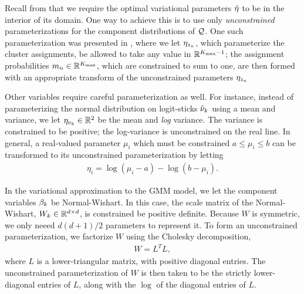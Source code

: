 Recall from  that we require the optimal variational parameters
$\hat\eta$ to be in the interior of its domain. One way to achieve this
is to use only \textit{unconstrained} parameterizations for the
component distributions of $\mathcal{Q}$. One such parameterization was
presented in , where we let
$\eta_{z_n}$, which parameterize the cluster assignments, be allowed to
take any value in $\mathbb{R}^{{K_{\mathrm{max}}} - 1}$; the assignment probabilities
$m_{n}\in\mathbb{R}^{{K_{\mathrm{max}}}}$, which are constrained to sum to one,
are then formed with an appropriate transform of the unconstrained parameters
$\eta_{z_n}$

Other variables require careful parameterization as well.
For instance, instead of parameterizing the normal distribution on
logit-sticks $\tilde{\nu}_k$ using a mean and variance, we let $\eta_{\nu_k}\in\mathbb{R}^2$
be the mean and \textit{log} variance. The variance is constrained to be positive;
the log-variance is unconstrained on the real line.
In general, a real-valued parameter $\mu_i$ which must be constrained
$a \leq \mu_i \leq b$ can be transformed to its unconstrained parameterization
by letting
\begin{align*}
  \eta_i = \log(\mu_i - a) - \log(b - \mu_i).
\end{align*}

In the variational approximation to the GMM model,
we let the component variables $\beta_k$ be Normal-Wishart.
In this case, the scale matrix of the Normal-Wishart, $W_k\in\mathbb{R}^{d\times d}$,
is constrained be positive definite.
Because $W$ is symmetric, we only neeed $d(d + 1) / 2$ parameters to represent it.
To form an unconstrained parameterization, we factorize $W$ using the Cholesky decomposition,
\begin{align*}
W = L^T L,
\end{align*}
where $L$ is a lower-triangular matrix, with positive diagonal entries.
The unconstrained parameterization of $W$ is then taken to be
the strictly lower-diagonal entries of $L$,
along with the $\log$ of the diagonal entries of $L$.
